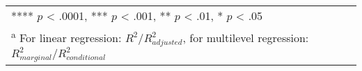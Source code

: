 \begin{landscape}
\begin{table}
\begin{minipage}[t][\textheight][t]{\textwidth}
{\begin{tabular}[t]{lcccccccccccc}
\multicolumn{13}{l}{\rule{0pt}{1em}**** $p$ < .0001, *** $p$ < .001, ** $p$ < .01, * $p$ < .05}\\
\multicolumn{13}{l}{\rule{0pt}{1em}\textsuperscript{a} For linear regression: $R^2 / R^2_{adjusted}$, for multilevel regression: $R^2_{marginal} / R^2_{conditional}$ }\\
\end{tabular}}
\end{minipage}
\end{table}
\end{landscape}
